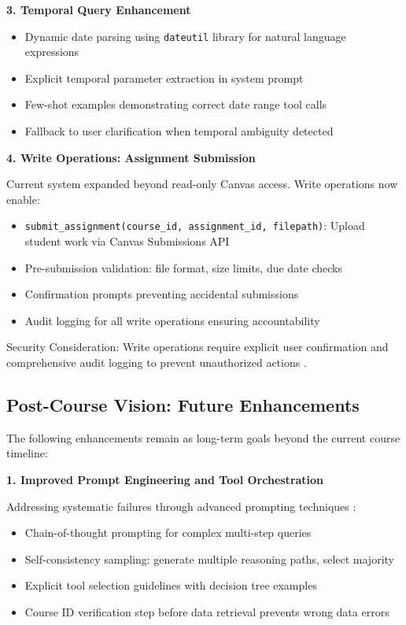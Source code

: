 \documentclass{article}
\begin{document}
\textbf{3. Temporal Query Enhancement}

\begin{itemize}
\item Dynamic date parsing using \texttt{dateutil} library for natural language expressions
\item Explicit temporal parameter extraction in system prompt
\item Few-shot examples demonstrating correct date range tool calls
\item Fallback to user clarification when temporal ambiguity detected
\end{itemize}

\textbf{4. Write Operations: Assignment Submission}

Current system expanded beyond read-only Canvas access. Write operations now enable:

\begin{itemize}
\item \texttt{submit\_assignment(course\_id, assignment\_id, filepath)}: Upload student work via Canvas Submissions API
\item Pre-submission validation: file format, size limits, due date checks
\item Confirmation prompts preventing accidental submissions
\item Audit logging for all write operations ensuring accountability
\end{itemize}

Security Consideration: Write operations require explicit user confirmation and comprehensive audit logging to prevent unauthorized actions \cite{mcpsecurity2025}.

\subsection{Post-Course Vision: Future Enhancements}

The following enhancements remain as long-term goals beyond the current course timeline:

\textbf{1. Improved Prompt Engineering and Tool Orchestration}

Addressing systematic failures through advanced prompting techniques \cite{prompt2024engineering, chain2023thought}:

\begin{itemize}
\item Chain-of-thought prompting for complex multi-step queries
\item Self-consistency sampling: generate multiple reasoning paths, select majority
\item Explicit tool selection guidelines with decision tree examples
\item Course ID verification step before data retrieval prevents wrong data errors
\end{itemize}
\end{document}
